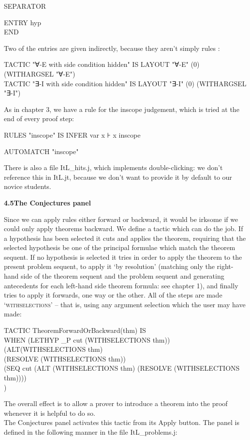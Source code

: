 \documentclass[11pt]{book}
\newcommand{\tab}{\hspace{5mm}}
\begin{document}
\tab SEPARATOR

\tab ENTRY hyp\\
END


Two of the entries are given indirectly, because they aren't simply rules :

TACTIC "∀-E with side condition hidden" IS LAYOUT "∀-E" (0) (WITHARGSEL "∀-E")\\
TACTIC "∃-I with side condition hidden" IS LAYOUT "∃-I" (0) (WITHARGSEL "∃-I")


As in chapter 3, we have a rule for the inscope judgement, which is tried at the end of every proof step:

RULES "inscope" IS INFER var x ⊦ x inscope

AUTOMATCH "inscope"


There is also a file ItL\_hits.j, which implements double-clicking: we don't reference this in ItL.jt, because we don't want to provide it by default to our novice students.


\textbf{{\large 4.5\tab The Conjectures panel}}


Since we can apply rules either forward or backward, it would be irksome if we could only apply theorems backward. We define a tactic which can do the job. If a hypothesis has been selected it cuts and applies the theorem, requiring that the selected hypothesis be one of the principal formulae which match the theorem sequent. If no hypothesis is selected it tries in order to apply the theorem to the present problem sequent, to apply it `by resolution' (matching only the right-hand side of the theorem sequent and the problem sequent and generating antecedents for each left-hand side theorem formula: see chapter 1), and finally tries to apply it forwards, one way or the other. All of the steps are made `\textsc{withselections}' -- that is, using any argument selection which the user may have made:

TACTIC TheoremForwardOrBackward(thm) IS\\
\tab WHEN \tab (LETHYP \_P cut (WITHSELECTIONS thm))\\
\tab \tab (ALT\tab (WITHSELECTIONS thm) \\
\tab \tab \tab (RESOLVE (WITHSELECTIONS thm)) \\
\tab \tab \tab (SEQ cut (ALT (WITHSELECTIONS thm) (RESOLVE (WITHSELECTIONS thm)))) \\
\tab \tab )


The overall effect is to allow a prover to introduce a theorem into the proof whenever it is helpful to do so.\\
The Conjectures panel activates this tactic from its Apply button. The panel is defined in the following manner in the file ItL\_problems.j:
\end{document}
